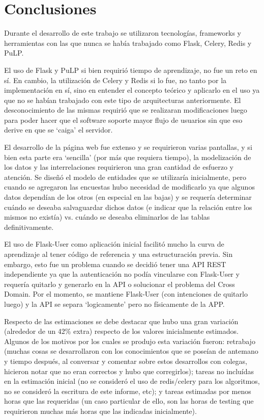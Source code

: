 \documentclass[a4paper]{article}
\begin{document}
\newpage
\section{Conclusiones}

Durante el desarrollo de este trabajo se utilizaron tecnologías, frameworks y herramientas con las que nunca se había trabajado como Flask, Celery, Redis y PuLP.

El uso de Flask y PuLP si bien requirió tiempo de aprendizaje, no fue un reto en sí. En cambio, la utilización de Celery y Redis si lo fue, no tanto por la implementación en sí, sino en entender el concepto teórico y aplicarlo en el uso ya que no se habían trabajado con este tipo de arquitecturas anteriormente. El desconocimiento de las mismas requirió que se realizaran modificaciones luego para poder hacer que el software soporte mayor flujo de usuarios sin que eso derive en que se `caiga' el servidor.\newline

El desarrollo de la página web fue extenso y se requirieron varias pantallas, y si bien esta parte era `sencilla' (por más que requiera tiempo), la modelización de los datos y las interrelaciones requirieron una gran cantidad de esfuerzo y atención. Se diseñó el modelo de entidades que se utilizaría inicialmente, pero cuando se agregaron las encuestas hubo necesidad de modificarlo ya que algunos datos dependían de los otros (en especial en las bajas) y se requería determinar cuándo se deseaba salvaguardar dichos datos (e indicar que la relación entre los mismos no existía) vs. cuándo se deseaba eliminarlos de las tablas definitivamente.\newline

El uso de Flask-User como aplicación inicial facilitó mucho la curva de aprendizaje al tener código de referencia y una estructuración previa. Sin embargo, esto fue un problema cuando se decidió tener una API REST independiente ya que la autenticación no podía vincularse con Flask-User y requería quitarlo y generarlo en la API o solucionar el problema del Cross Domain. Por el momento, se mantiene Flask-User (con intenciones de quitarlo luego) y la API se separa `logicamente' pero no físicamente de la APP.\newline

Respecto de las estimaciones se debe destacar que hubo una gran variación (alrededor de un 42\% extra) respecto de los valores inicialmente estimados. Algunos de los motivos por los cuales se produjo esta variación fueron: retrabajo (muchas cosas se desarrollaron con los conocimientos que se poseían de antemano y tiempo después, al conversar y comentar sobre estos desarrollos con colegas, hicieron notar que no eran correctos y hubo que corregirlos); tareas no incluídas en la estimación inicial (no se consideró el uso de redis/celery para los algoritmos, no se consideró la escritura de este informe, etc); y tareas estimadas por menos horas que las requeridas (un caso particular de ello, son las horas de testing que requirieron muchas más horas que las indicadas inicialmente).\newline
\end{document}
